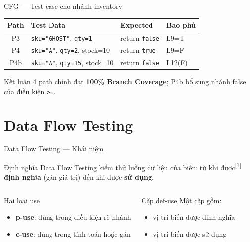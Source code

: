 \documentclass[aspectratio=169,12pt]{beamer}
\newcommand{\sref}[1]{\textsuperscript{\scriptsize[#1]}}
\begin{document}
\begin{frame}{CFG --- Test case cho nhánh inventory}
  \large
  \renewcommand{\arraystretch}{1.35}
  \begin{tabularx}{\textwidth}{cXll}
    \toprule
    \textbf{Path} & \textbf{Test Data} & \textbf{Expected} & \textbf{Bao phủ} \\
    \midrule
    P3 & \texttt{sku="GHOST"}, \texttt{qty=1} & return \texttt{false} & L9=T \\
    P4 & \texttt{sku="A"}, \texttt{qty=2}, stock=10 & return \texttt{true} & L9=F \\
    P4b & \texttt{sku="A"}, \texttt{qty=15}, stock=10 & return \texttt{false} & L12(F) \\
    \bottomrule
  \end{tabularx}
  \renewcommand{\arraystretch}{1}

  \vspace{0.1em}
  \begin{block}{Kết luận}
    4 path chính đạt \textbf{100\% Branch Coverage}; P4b bổ sung nhánh false của điều kiện \texttt{>=}.
  \end{block}
\end{frame}

\section{Data Flow Testing}

\begin{frame}[shrink=12]{Data Flow Testing --- Khái niệm}
  \begin{block}{Định nghĩa}
    Data Flow Testing kiểm thử luồng dữ liệu của biến: từ khi được\sref{1}
    \textbf{định nghĩa} (gán giá trị) đến khi được \textbf{sử dụng}.
  \end{block}

  \vspace{0.15em}
  \normalsize
  \begin{columns}[T,totalwidth=\textwidth]
    \begin{block}{Hai loại use}
      \begin{itemize}
        \item \textbf{p-use}: dùng trong điều kiện rẽ nhánh
        \item \textbf{c-use}: dùng trong tính toán hoặc gán
      \end{itemize}
    \end{block}

    \begin{block}{Cặp def-use}
      Một cặp gồm:
      \begin{itemize}
        \item vị trí biến được định nghĩa
        \item vị trí biến được sử dụng
      \end{itemize}
    \end{block}
  \end{columns}
\end{frame}
\end{document}
